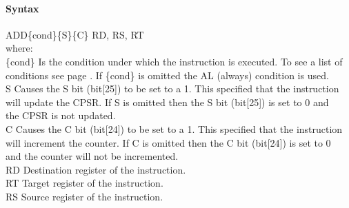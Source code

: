 \documentclass[12pt]{article}
\begin{document}
    \paragraph{Syntax}
    \begin{flushleft}
    ADD\{cond\}\{S\}\{C\} RD, RS, RT\\
    \vspace{1em}        %
    where:\\
    \vspace{1em}
    \{cond\}    \hspace{2em} Is the condition under which the instruction is executed. To see a list of\\
                \hspace{5.4em} conditions see page . If \{cond\} is omitted the AL (always) condition is used.\\
    \vspace{1em}    
    S       \hspace{4.5em} Causes the S bit (bit[25]) to be set to a 1. This specified that the instruction\\
            \hspace{5.4em} will update the CPSR. If S is omitted then the S bit (bit[25]) is set to 0 and\\
            \hspace{5.4em} the CPSR is not updated.\\
    \vspace{1em}    
    C       \hspace{4.5em} Causes the C bit (bit[24]) to be set to a 1. This specified that the instruction\\
            \hspace{5.4em} will increment the counter. If C is omitted then the C bit (bit[24]) is set to 0\\
            \hspace{5.4em} and the counter will not be incremented.\\
    \vspace{1em}
    RD  \hspace{3.6em} Destination register of the instruction.\\
    \vspace{1em}
    RT  \hspace{3.7em} Target register of the instruction.\\
    \vspace{1em}
    RS  \hspace{3.85em} Source register of the instruction.\\
    \end{flushleft}
    
\end{document}
